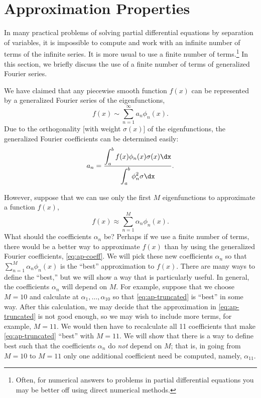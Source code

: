 \section{Approximation Properties}
\label{sec:sl-approximation}

In many practical problems of solving partial differential equations by separation of variables, it is impossible to compute and work with an infinite number of terms of the infinite series.  It is more usual to use a finite number of terms.\footnote{Often, for numerical answers to problems in partial differential equations you may be better off using direct numerical methods.}  In this section, we briefly discuss the use of a finite number of terms of generalized Fourier series.

We have claimed that any piecewise smooth function $f(x)$ can be represented by a generalized Fourier series of the eigenfunctions,
\begin{equation}
\label{eq:ap-gfs}
f(x) \sim \sum_{n=1}^{\infty} a_n\phi_n(x).
\end{equation}
Due to the orthogonality [with weight $\sigma(x)$] of the eigenfunctions, the generalized Fourier coefficients can be determined easily:
\begin{equation}
\label{eq:ap-coeff}
a_n = \frac{\displaystyle\int_a^b f(x)\phi_n(x)\sigma(x)\dx}{\displaystyle\int_a^b \phi_n^2\sigma\dx}.
\end{equation}

However, suppose that we can use only the first $M$ eigenfunctions to approximate a function $f(x)$,
\begin{equation}
\label{eq:ap-truncated}
f(x) \approx \sum_{n=1}^{M} \alpha_n\phi_n(x).
\end{equation}
What should the coefficients $\alpha_n$ be?  Perhaps if we use a finite number of terms, there would be a better way to approximate $f(x)$ than by using the generalized Fourier coefficients, \eqref{eq:ap-coeff}.  We will pick these new coefficients $\alpha_n$ so that $\sum_{n=1}^M \alpha_n\phi_n(x)$ is the ``best'' approximation to $f(x)$.  There are many ways to define the ``best,'' but we will show a way that is particularly useful.  In general, the coefficients $\alpha_n$ will depend on $M$.  For example, suppose that we choose $M = 10$ and calculate at $\alpha_1, \ldots, \alpha_{10}$ so that \eqref{eq:ap-truncated} is ``best'' in some way.  After this calculation, we may decide that the approximation in \eqref{eq:ap-truncated} is not good enough, so we may wish to include more terms, for example, $M = 11$.  We would then have to recalculate all 11 coefficients that make \eqref{eq:ap-truncated} ``best'' with $M = 11$.  We will show that there is a way to define best such that the coefficients $\alpha_n$ do \textit{not} depend on $M$; that is, in going from $M = 10$ to $M = 11$ only one additional coefficient need be computed, namely, $\alpha_{11}$.

